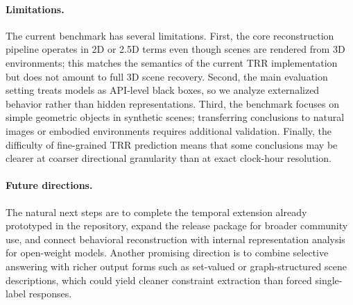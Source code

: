 \paragraph{Limitations.}
The current benchmark has several limitations. First, the core reconstruction pipeline operates in 2D or 2.5D terms even though scenes are rendered from 3D environments; this matches the semantics of the current TRR implementation but does not amount to full 3D scene recovery. Second, the main evaluation setting treats models as API-level black boxes, so we analyze externalized behavior rather than hidden representations. Third, the benchmark focuses on simple geometric objects in synthetic scenes; transferring conclusions to natural images or embodied environments requires additional validation. Finally, the difficulty of fine-grained TRR prediction means that some conclusions may be clearer at coarser directional granularity than at exact clock-hour resolution.

\paragraph{Future directions.}
The natural next steps are to complete the temporal extension already prototyped in the repository, expand the release package for broader community use, and connect behavioral reconstruction with internal representation analysis for open-weight models. Another promising direction is to combine selective answering with richer output forms such as set-valued or graph-structured scene descriptions, which could yield cleaner constraint extraction than forced single-label responses.
